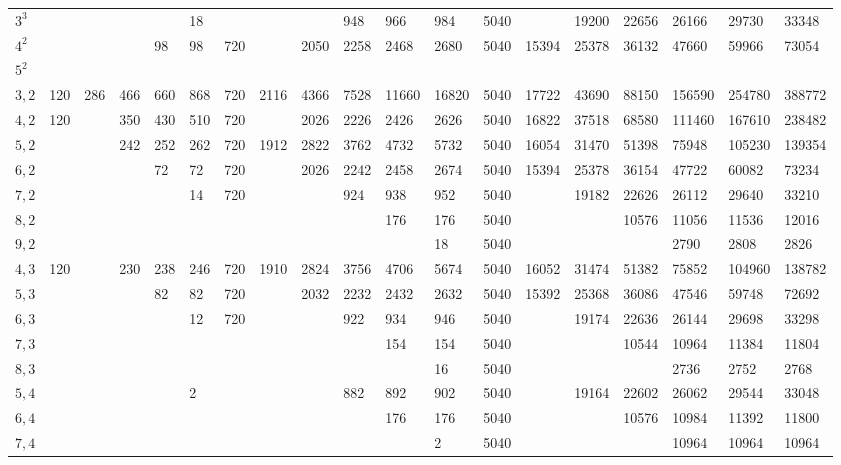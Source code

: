 \documentclass{amsart}
\numberwithin{equation}{section}
\begin{document}
\begin{table}
\begin{tabular}{@{}l GWGWGWGWGWGWGWGWGW@{}}
		$3^3$ &  &  &  &  & 18 &  &  &  & 948 & 966 & 984 & 5040 &  & 19200 & 22656 & 26166 & 29730 & 33348 \\
		$4^2$ &  &  &  & 98 & 98 & 720 &  & 2050 & 2258 & 2468 & 2680 & 5040 & 15394 & 25378 & 36132 & 47660 & 59966 & 73054 \\
		$5^2$ &  &  &  &  &  &  &  &  &  &  &  &  &  &  &  &  &  &  \\
		$3,2$ & 120 & 286 & 466 & 660 & 868 & 720 & 2116 & 4366 & 7528 & 11660 & 16820 & 5040 & 17722 & 43690 & 88150 & 156590 & 254780 & 388772 \\
		$4,2$ & 120 &  & 350 & 430 & 510 & 720 &  & 2026 & 2226 & 2426 & 2626 & 5040 & 16822 & 37518 & 68580 & 111460 & 167610 & 238482 \\
		$5,2$ &  &  & 242 & 252 & 262 & 720 & 1912 & 2822 & 3762 & 4732 & 5732 & 5040 & 16054 & 31470 & 51398 & 75948 & 105230 & 139354 \\
		$6,2$ &  &  &  & 72 & 72 & 720 &  & 2026 & 2242 & 2458 & 2674 & 5040 & 15394 & 25378 & 36154 & 47722 & 60082 & 73234 \\
		$7,2$ &  &  &  &  & 14 & 720 &  &  & 924 & 938 & 952 & 5040 &  & 19182 & 22626 & 26112 & 29640 & 33210 \\
		$8,2$ &  &  &  &  &  &  &  &  &  & 176 & 176 & 5040 &  &  & 10576 & 11056 & 11536 & 12016 \\
		$9,2$ &  &  &  &  &  &  &  &  &  &  & 18 & 5040 &  &  &  & 2790 & 2808 & 2826 \\
		$4,3$ & 120 &  & 230 & 238 & 246 & 720 & 1910 & 2824 & 3756 & 4706 & 5674 & 5040 & 16052 & 31474 & 51382 & 75852 & 104960 & 138782 \\
		$5,3$ &  &  &  & 82 & 82 & 720 &  & 2032 & 2232 & 2432 & 2632 & 5040 & 15392 & 25368 & 36086 & 47546 & 59748 & 72692 \\
		$6,3$ &  &  &  &  & 12 & 720 &  &  & 922 & 934 & 946 & 5040 &  & 19174 & 22636 & 26144 & 29698 & 33298 \\
		$7,3$ &  &  &  &  &  &  &  &  &  & 154 & 154 & 5040 &  &  & 10544 & 10964 & 11384 & 11804 \\
		$8,3$ &  &  &  &  &  &  &  &  &  &  & 16 & 5040 &  &  &  & 2736 & 2752 & 2768 \\
		$5,4$ &  &  &  &  & 2 &  &  &  & 882 & 892 & 902 & 5040 &  & 19164 & 22602 & 26062 & 29544 & 33048 \\
		$6,4$ &  &  &  &  &  &  &  &  &  & 176 & 176 & 5040 &  &  & 10576 & 10984 & 11392 & 11800 \\
		$7,4$ &  &  &  &  &  &  &  &  &  &  & 2 & 5040 &  &  &  & 10964 & 10964 & 10964 \\

\end{tabular}
\end{table}
\end{document}
